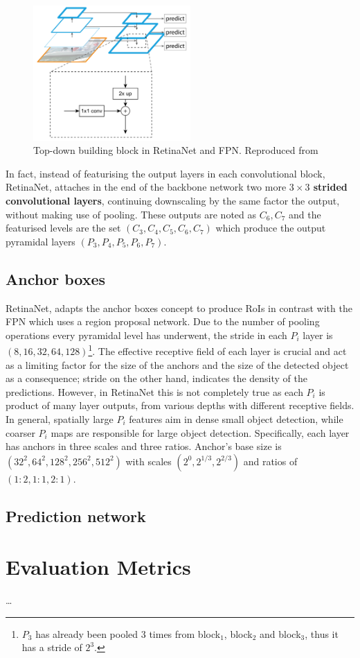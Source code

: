 \begin{figure}[!htb]
  \centering
  \includegraphics[width=6cm]{images/ch2/fig10.png}
  \caption{Top-down building block in RetinaNet and FPN. Reproduced from \cite{lin2017feature}}
  \label{fig10}
\end{figure} 

In fact, instead of featurising the output layers in each convolutional block, RetinaNet, attaches in the end of the backbone network two more \textbf{$3\times3$ strided convolutional layers}, continuing downscaling by the same factor the output, without making use of pooling. These outputs are noted as $C_6,C_7$ and the featurised levels are the set $(C_3, C_4, C_5, C_6, C_7)$ which produce the output pyramidal layers $(P_3, P_4, P_5, P_6, P_7)$.

\subsection{Anchor boxes}
RetinaNet, adapts the anchor boxes concept to produce RoIs in contrast with the FPN which uses a region proposal network. Due to the number of pooling operations every pyramidal level has underwent, the stride in each $P_i$ layer is $(8, 16, 32, 64, 128)$\footnote{$P_3$ has already been pooled 3 times from block$_1$, block$_2$ and block$_3$, thus it has a stride of $2^3$.}. The effective receptive field of each layer is crucial and act as a limiting factor for the size of the anchors and the size of the detected object as a consequence; stride on the other hand, indicates the density of the predictions. However, in RetinaNet this is not completely true as each $P_i$ is product of many layer outputs, from various depths with different receptive fields. In general, spatially large $P_i$ features aim in dense small object detection, while coarser $P_i$ maps are responsible for large object detection. Specifically, each layer has anchors in three scales and three ratios. Anchor's base size is $(32^2, 64^2, 128^2, 256^2, 512^2)$ with scales $(2^0, 2^{1/3}, 2^{2/3})$ and ratios of $(1\!:\!2,1\!:\!1,2\!:\!1)$.

\subsection{Prediction network}

\section{Evaluation Metrics}

\dots